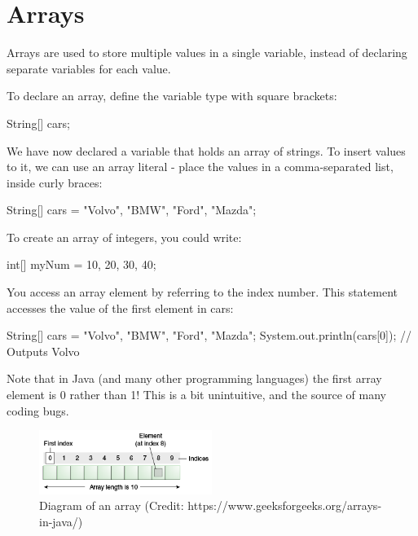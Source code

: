 \chapter{Arrays}
\label{ch:arrays}

\begin{goals}
\item 
\end{goals}

Arrays are used to store multiple values in a single variable, instead of declaring separate variables for each value.

To declare an array, define the variable type with square brackets:

\begin{code}
String[] cars;
\end{code}

We have now declared a variable that holds an array of strings. To insert values to it, we can use an array literal - place the values in a comma-separated list, inside curly braces:

\begin{code}
String[] cars = {"Volvo", "BMW", "Ford", "Mazda"};
\end{code}

To create an array of integers, you could write:

\begin{code}
int[] myNum = {10, 20, 30, 40};
\end{code}

You access an array element by referring to the index number. This statement accesses the value of the first element in cars:
\begin{code}
String[] cars = {"Volvo", "BMW", "Ford", "Mazda"};
System.out.println(cars[0]);
// Outputs Volvo
\end{code}

Note that in Java (and many other programming languages) the first array element is 0 rather than 1! This is a bit unintuitive, and the source of many coding bugs. 

\begin{figure}
	\centering
	\includegraphics[width=0.5\textwidth]{images/array-diagram.png}
	\caption{Diagram of an array (Credit: https://www.geeksforgeeks.org/arrays-in-java/)}
\end{figure}

